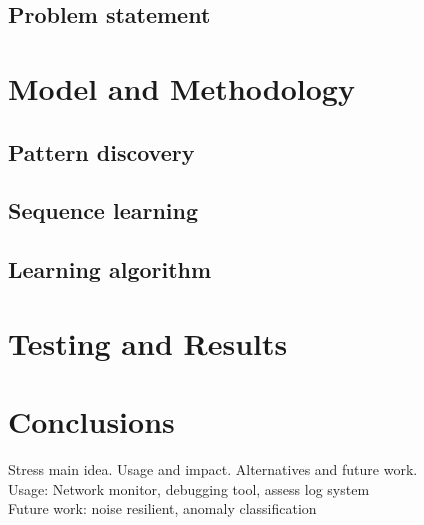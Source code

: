 \documentclass[conference]{IEEEtran}
\begin{document}
\subsection{Problem statement}


\section{Model and Methodology}
\subsection{Pattern discovery}
\subsection{Sequence learning}
\subsection{Learning algorithm}



\section{Testing and Results}
\section{Conclusions}
Stress main idea. Usage and impact. Alternatives and future work.\\
Usage: Network monitor, debugging tool, assess log system\\
Future work: noise resilient, anomaly classification


%
%
\end{document}
